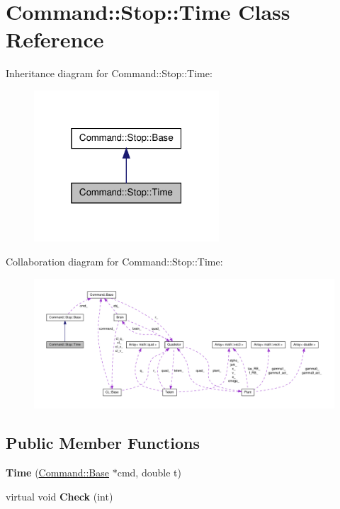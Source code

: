 \hypertarget{classCommand_1_1Stop_1_1Time}{\section{\-Command\-:\-:\-Stop\-:\-:\-Time \-Class \-Reference}
\label{classCommand_1_1Stop_1_1Time}
}


\-Inheritance diagram for \-Command\-:\-:\-Stop\-:\-:\-Time\-:\nopagebreak
\begin{figure}[H]
\begin{center}
\leavevmode
\includegraphics[width=196pt]{classCommand_1_1Stop_1_1Time__inherit__graph}
\end{center}
\end{figure}


\-Collaboration diagram for \-Command\-:\-:\-Stop\-:\-:\-Time\-:\nopagebreak
\begin{figure}[H]
\begin{center}
\leavevmode
\includegraphics[width=350pt]{classCommand_1_1Stop_1_1Time__coll__graph}
\end{center}
\end{figure}
\subsection*{\-Public \-Member \-Functions}
\begin{DoxyCompactItemize}
\item 
\hypertarget{classCommand_1_1Stop_1_1Time_a4568ced87aad2d8bb8abcbd0188458d1}{{\bfseries \-Time} (\hyperlink{classCommand_1_1Base}{\-Command\-::\-Base} $\ast$cmd, double t)}\label{classCommand_1_1Stop_1_1Time_a4568ced87aad2d8bb8abcbd0188458d1}

\item 
\hypertarget{classCommand_1_1Stop_1_1Time_ab90dbacde37291aa0f778019bb8c5f6f}{virtual void {\bfseries \-Check} (int)}\label{classCommand_1_1Stop_1_1Time_ab90dbacde37291aa0f778019bb8c5f6f}

\end{DoxyCompactItemize}
